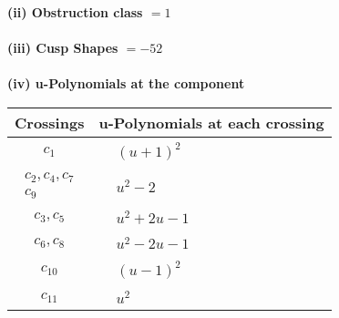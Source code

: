 \documentclass[1p]{elsarticle_modified}
\theoremstyle{definition}
\begin{document}
\flushleft \textbf{(ii) Obstruction class $= 1$}\\~\\
\flushleft \textbf{(iii) Cusp Shapes $= -52$}\\~\\
\newpage\renewcommand{\arraystretch}{1}
\flushleft \textbf{(iv) u-Polynomials at the component}\newline \\
\begin{tabular}{m{50pt}|m{274pt}}
Crossings & \hspace{64pt}u-Polynomials at each crossing \\
\hline $$\begin{aligned}c_{1}\end{aligned}$$&$\begin{aligned}
&(u+1)^2
\end{aligned}$\\
\hline $$\begin{aligned}c_{2},c_{4},c_{7}\\c_{9}\end{aligned}$$&$\begin{aligned}
&u^2-2
\end{aligned}$\\
\hline $$\begin{aligned}c_{3},c_{5}\end{aligned}$$&$\begin{aligned}
&u^2+2 u-1
\end{aligned}$\\
\hline $$\begin{aligned}c_{6},c_{8}\end{aligned}$$&$\begin{aligned}
&u^2-2 u-1
\end{aligned}$\\
\hline $$\begin{aligned}c_{10}\end{aligned}$$&$\begin{aligned}
&(u-1)^2
\end{aligned}$\\
\hline $$\begin{aligned}c_{11}\end{aligned}$$&$\begin{aligned}
&u^2
\end{aligned}$\\
\hline
\end{tabular}\\~\\
\end{document}
